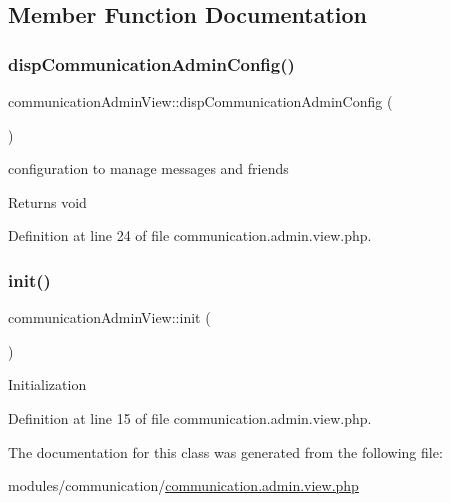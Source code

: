 \subsection{Member Function Documentation}
\hypertarget{classcommunicationAdminView_a622dd5ee36cad7a2c2e9d9eea814b0eb}{}\label{classcommunicationAdminView_a622dd5ee36cad7a2c2e9d9eea814b0eb} 
\subsubsection{\texorpdfstring{disp\+Communication\+Admin\+Config()}{dispCommunicationAdminConfig()}}
{\footnotesize\ttfamily communication\+Admin\+View\+::disp\+Communication\+Admin\+Config (\begin{DoxyParamCaption}{ }\end{DoxyParamCaption})}

configuration to manage messages and friends \begin{DoxyReturn}{Returns}
void 
\end{DoxyReturn}


Definition at line 24 of file communication.\+admin.\+view.\+php.

\hypertarget{classcommunicationAdminView_a75c54eb9cc38929b399c2e5aa600c979}{}\label{classcommunicationAdminView_a75c54eb9cc38929b399c2e5aa600c979} 
\subsubsection{\texorpdfstring{init()}{init()}}
{\footnotesize\ttfamily communication\+Admin\+View\+::init (\begin{DoxyParamCaption}{ }\end{DoxyParamCaption})}

Initialization 

Definition at line 15 of file communication.\+admin.\+view.\+php.



The documentation for this class was generated from the following file\+:\begin{DoxyCompactItemize}
\item 
modules/communication/\hyperlink{communication_8admin_8view_8php}{communication.\+admin.\+view.\+php}\end{DoxyCompactItemize}

